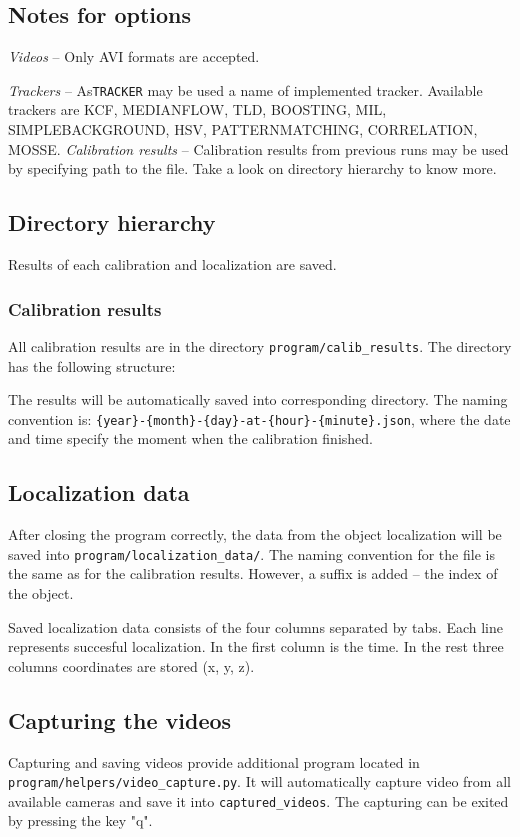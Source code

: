 \begin{figure}
\lstset{basicstyle=\ttfamily\footnotesize,breaklines=true,frame=lrtb}

\end{figure}

\subsection{Notes for options}
\emph{Videos} -- Only AVI formats are accepted.

\emph{Trackers} -- As\verb+TRACKER+ may be used a name of implemented tracker. Available trackers
are KCF, MEDIANFLOW, TLD, BOOSTING, MIL, SIMPLEBACKGROUND, HSV,
PATTERNMATCHING, CORRELATION, MOSSE.
\emph{Calibration results} -- Calibration results from previous runs may be
used by specifying path to the file. Take a look on directory hierarchy to know
more.

\subsection{Directory hierarchy}
Results of each calibration and localization are saved.

\subsubsection{Calibration results}
All calibration results are in the directory \verb+program/calib_results+. The
directory has the following structure:

\begin{figure}
 \end{figure}

The results will be automatically saved into corresponding directory. The
naming convention is: \verb+{year}-{month}-{day}-at-{hour}-{minute}.json+,
where the date and time specify the moment when the calibration finished.

\subsection{Localization data}
After closing the program correctly, the data from the object localization will
be saved into \verb+program/localization_data/+. The naming convention for the
file is the same as for the calibration results. However, a suffix is added --
the index of the object.

Saved localization data consists of the four columns separated by tabs. Each
line represents succesful localization. In the first column is the time. In the
rest three columns coordinates are stored (x, y, z).

\subsection{Capturing the videos} 

Capturing and saving videos provide additional program located in
\verb+program/helpers/video_capture.py+. It will automatically capture video
from all available cameras and save it into \verb+captured_videos+. The
capturing can be exited by pressing the key "q".
